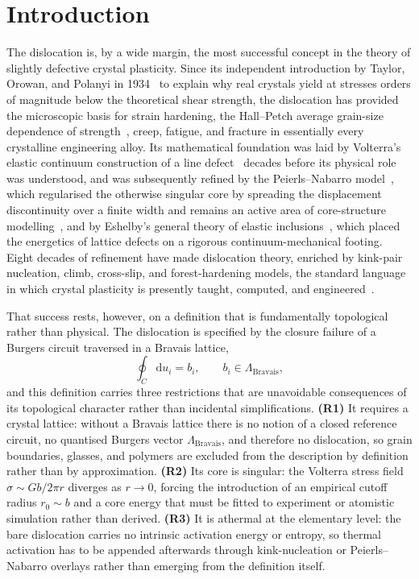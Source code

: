 \documentclass[3p]{elsarticle}
\begin{document}
\section{Introduction}
\label{sec:intro}

The dislocation is, by a wide margin, the most successful concept in
the theory of slightly defective crystal plasticity. Since its independent introduction
by Taylor, Orowan, and Polanyi in 1934~\citep{taylor1934,orowan1934,polanyi1934}
to explain why real crystals yield at stresses orders of magnitude
below the theoretical shear strength, the dislocation has provided
the microscopic basis for strain hardening, the Hall--Petch average
grain-size dependence of
strength~\citep{hall1951,petch1953,dunstanbushby2014,zhang2020hallpetch}, creep, fatigue, and
fracture in essentially every crystalline engineering alloy. Its
mathematical foundation was laid by Volterra's elastic continuum
construction of a line defect~\citep{volterra1907} decades before its
physical role was understood, and was subsequently refined by the
Peierls--Nabarro model~\citep{peierls1940,nabarro1947}, which regularised
the otherwise singular core by spreading the displacement
discontinuity over a finite width and remains an active area of
core-structure modelling~\citep{xu2020disregistry}, and by Eshelby's general theory of
elastic inclusions~\citep{eshelby1957}, which placed the energetics of
lattice defects on a rigorous continuum-mechanical footing. Eight
decades of refinement have made dislocation theory, enriched by
kink-pair nucleation, climb, cross-slip, and forest-hardening models,
the standard language in which crystal plasticity is presently taught,
computed, and engineered~\citep{hirth1982,mcdowell2025thermo}.

That success rests, however, on a definition that is fundamentally
topological rather than physical. The dislocation is specified by
the closure failure of a Burgers circuit traversed in a Bravais
lattice,
\begin{equation}
  \oint_C \mathrm{d}u_i = b_i,\qquad b_i\in\Lambda_\mathrm{Bravais},
  \label{eq:burgers}
\end{equation}
and this definition carries three restrictions that are unavoidable
consequences of its topological character rather than incidental
simplifications. \textbf{(R1)} It requires a crystal lattice: without
a Bravais lattice there is no notion of a closed reference circuit,
no quantised Burgers vector $\Lambda_\mathrm{Bravais}$, and therefore
no dislocation, so grain boundaries, glasses, and polymers are
excluded from the description by definition rather than by
approximation. \textbf{(R2)} Its core is singular: the Volterra
stress field $\sigma\sim Gb/2\pi r$ diverges as $r\to0$, forcing the
introduction of an empirical cutoff radius $r_0\sim b$ and a core
energy that must be fitted to experiment or atomistic simulation
rather than derived. \textbf{(R3)} It is athermal at the elementary
level: the bare dislocation carries no intrinsic activation energy or
entropy, so thermal activation has to be appended afterwards through
kink-nucleation or Peierls--Nabarro overlays rather than emerging from
the definition itself.
\end{document}
